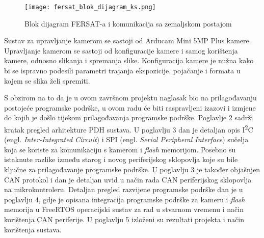 \begin{figure}[H]
	\centering
	\texttt{[image: fersat\_blok\_dijagram\_ks.png]}
	\caption{Blok dijagram FERSAT-a i komunikacija sa zemaljskom postajom \cite{diplomski_goran_petrak}}
	\label{fig:fersat_blok_ks}
\end{figure}

Sustav za upravljanje kamerom se sastoji od Arducam Mini 5MP Plus kamere. Upravljanje kamerom se sastoji od konfiguracije kamere i samog korištenja kamere, odnosno slikanja i spremanja slike. Konfiguracija kamere je nužna kako bi se ispravno podesili parametri trajanja ekspozicije, pojačanje i formata u kojem se slika želi spremiti.

S obzirom na to da je u ovom završnom projektu naglasak bio na prilagođavanju postojeće programske podrške, u ovom radu će biti raspravljeni izazovi i izmjene do kojih je došlo tijekom prilagođavanja programske podrške. Poglavlje 2 sadrži kratak pregled arhitekture PDH sustava. U poglavlju 3 dan je detaljan opis I\textsuperscript{2}C (engl. \textit{Inter-Integrated Circuit}) i SPI (engl. \textit{Serial Peripheral Interface}) sučelja koja se koriste za komunikaciju s kamerom i \textit{flash} memorijom. Posebno su istaknute razlike između starog i novog periferijskog sklopovlja koje su bile ključne za prilagođavanje programske podrške. U poglavlju 3 je također objašnjen CAN protokol i dan je detaljan uvid u način rada CAN periferijskog sklopovlja na mikrokontroleru. Detaljan pregled razvijene programske podrške dan je u poglavlju 4, gdje je opisana integracija programske podrške za kameru i \textit{flash} memorija u FreeRTOS operacijski sustav za rad u stvarnom vremenu i način korištenja CAN periferije. U poglavlju 5 izloženi su rezultati projekta i način korištenja sustava.